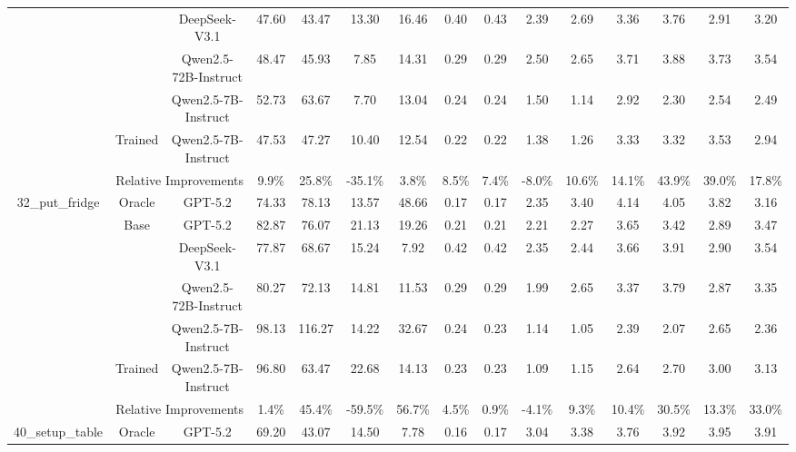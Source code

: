 \documentclass{article}
\theoremstyle{plain}
\theoremstyle{definition}
\theoremstyle{remark}
\begin{document}
\begin{table}[htbp]
{\begin{tabular}{c|c|r|cccccc|cccccc}
            &       & \multicolumn{1}{c|}{DeepSeek-V3.1} & 47.60  & 43.47  & 13.30  & 16.46  & 0.40  & 0.43  & 2.39  & 2.69  & 3.36  & 3.76  & 2.91  & 3.20  \\
            &       & \multicolumn{1}{c|}{Qwen2.5-72B-Instruct} & 48.47  & 45.93  & 7.85  & 14.31  & 0.29  & 0.29  & 2.50  & 2.65  & 3.71  & 3.88  & 3.73  & 3.54  \\
            &       & \multicolumn{1}{c|}{Qwen2.5-7B-Instruct} & 52.73  & 63.67  & 7.70  & 13.04  & 0.24  & 0.24  & 1.50  & 1.14  & 2.92  & 2.30  & 2.54  & 2.49  \\
  \cmidrule{2-15}          & Trained & \multicolumn{1}{c|}{Qwen2.5-7B-Instruct} & 47.53  & 47.27  & 10.40  & 12.54  & 0.22  & 0.22  & 1.38  & 1.26  & 3.33  & 3.32  & 3.53  & 2.94  \\
  \cmidrule{2-15}          & \multicolumn{2}{c|}{Relative Improvements} & 9.9\% & 25.8\% & -35.1\% & 3.8\% & 8.5\% & 7.4\% & -8.0\% & 10.6\% & 14.1\% & 43.9\% & 39.0\% & 17.8\% \\
      \midrule
      \multirow{7}[8]{*}{32\_put\_fridge} & Oracle & \multicolumn{1}{c|}{GPT-5.2} & 74.33 & 78.13 & 13.57 & 48.66 & 0.17 & 0.17 & 2.35 & 3.40 & 4.14 & 4.05 & 3.82 & 3.16  \\
\cmidrule{2-15} & \multirow{4}[2]{*}{Base} & \multicolumn{1}{c|}{GPT-5.2} & 82.87 & 76.07 & 21.13 & 19.26 & 0.21 & 0.21 & 2.21 & 2.27 & 3.65 & 3.42 & 2.89 & 3.47  \\
            &       & \multicolumn{1}{c|}{DeepSeek-V3.1} & 77.87  & 68.67  & 15.24  & 7.92  & 0.42  & 0.42  & 2.35  & 2.44  & 3.66  & 3.91  & 2.90  & 3.54  \\
            &       & \multicolumn{1}{c|}{Qwen2.5-72B-Instruct} & 80.27  & 72.13  & 14.81  & 11.53  & 0.29  & 0.29  & 1.99  & 2.65  & 3.37  & 3.79  & 2.87  & 3.35  \\
            &       & \multicolumn{1}{c|}{Qwen2.5-7B-Instruct} & 98.13  & 116.27  & 14.22  & 32.67  & 0.24  & 0.23  & 1.14  & 1.05  & 2.39  & 2.07  & 2.65  & 2.36  \\
  \cmidrule{2-15}          & Trained & \multicolumn{1}{c|}{Qwen2.5-7B-Instruct} & 96.80  & 63.47  & 22.68  & 14.13  & 0.23  & 0.23  & 1.09  & 1.15  & 2.64  & 2.70  & 3.00  & 3.13  \\
  \cmidrule{2-15}          & \multicolumn{2}{c|}{Relative Improvements} & 1.4\% & 45.4\% & -59.5\% & 56.7\% & 4.5\% & 0.9\% & -4.1\% & 9.3\% & 10.4\% & 30.5\% & 13.3\% & 33.0\% \\
      \midrule
      \multirow{7}[8]{*}{40\_setup\_table} & Oracle & \multicolumn{1}{c|}{GPT-5.2} & 69.20 & 43.07 & 14.50 & 7.78 & 0.16 & 0.17 & 3.04 & 3.38 & 3.76 & 3.92 & 3.95 & 3.91  \\

\end{tabular}}
\end{table}
\end{document}
